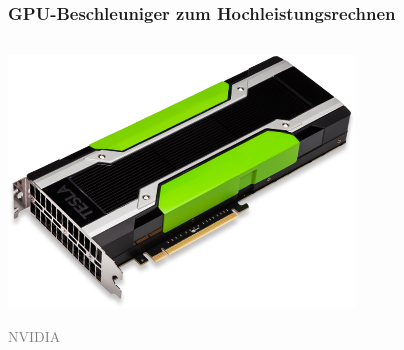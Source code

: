 \begin{frame}
    \frametitle{GPU-Beschleuniger zum Hochleistungsrechnen}
    \begin{columns}
        \begin{column}
            \begin{center}
                \includegraphics[height=0.1\textheight]{tesla-3-quater.png}
            \end{center}
            \textcolor{gray}{\scriptsize{NVIDIA}}
        \end{column}\begin{column}
            \begin{center}

\end{center}
\end{column}
\end{columns}
\end{frame}
